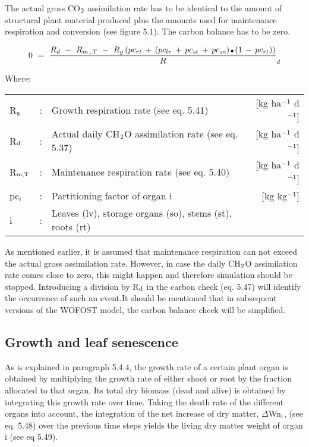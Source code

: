 The actual gross CO$_{{\rm 2}}$ assimilation rate has to be identical to the amount of structural plant
material produced plus the amounts used for maintenance respiration and conversion (see
figure 5.1). The carbon balance has to be zero. 

\begin{equation}
0~=~{\frac{R _{d} ~-~ R _{m\, ,\, T} ~-~ R _{g} \, (pc _{rt} \, +\, (pc _{lv} \, +\, pc _{st} \, +\, pc _{so} )\, {\rm \Bullet{0.75ex}}\, (1\, -\, pc _{rt} ))}{R}} _{d} 
\end{equation}

Where:\\
\begin{tabularx}{\textwidth}{llXr}
R$_{{\rm g}}$ &:& Growth respiration rate (see eq. 5.41)   &
     [kg ha$^{{\rm -1}}$ d$^{{\rm -1}}$]\\
R$_{{\rm d}}$ &:& Actual daily CH$_{{\rm 2}}$O assimilation rate (see eq. 5.37)   &
     [kg ha$^{{\rm -1}}$ d$^{{\rm -1}}$]\\
R$_{{\rm m,T}}$ &:& Maintenance respiration rate (see eq. 5.40)   &
     [kg ha$^{{\rm -1}}$ d$^{{\rm -1}}$]\\
pc$_{{\rm i}}$ &:& Partitioning factor of organ i    &
     [kg kg$^{{\rm -1}}$]\\
i &:& Leaves (lv), storage organs (so), stems (st), roots (rt)\\
\end{tabularx}

As mentioned earlier, it is assumed that maintenance respiration can not exceed the actual
gross assimilation rate. However, in case the daily CH$_{{\rm 2}}$O assimilation rate comes close to
zero, this might happen and therefore simulation should be stopped. Introducing a
division by R$_{{\rm d}}$ in the carbon check (eq. 5.47) will identify the occur\-rence of such an
event.It should be mentioned that in subsequent versions of the WOFOST model, the carbon
balance check will be simplified.

\subsection{Growth and leaf senescence  }

As is explained in paragraph 5.4.4, the growth rate of a certain plant organ is obtained by
multi\-plying the growth rate of either shoot or root by the fraction allocated to that organ.
Its total dry biomass (dead and alive) is obtained by integrating this growth rate over
time. Taking the death rate of the different organs into account, the integration of the net
increase of dry matter, $\Delta$Wn$_{{\rm i}}$, (see eq. 5.48) over the previous time steps 
yields the living dry matter weight of organ i (see eq 5.49).

